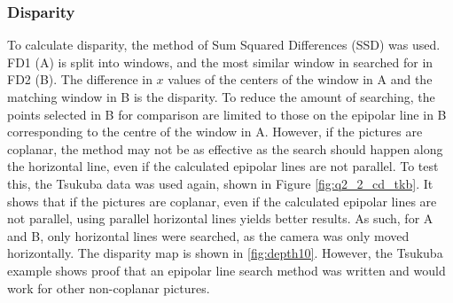\documentclass[a4paper, 10pt, conference]{ieeeconf}
\begin{document}
\subsubsection{Disparity}
To calculate disparity, the method of Sum Squared Differences (SSD) was used. FD1 (A) is split into windows, and the most similar window in searched for in FD2 (B). The difference in $x$ values of the centers of the window in A and the matching window in B is the disparity. To reduce the amount of searching, the points selected in B for comparison are limited to those on the epipolar line in B corresponding to the centre of the window in A. However, if the pictures are coplanar, the method may not be as effective as the search should happen along the horizontal line, even if the calculated epipolar lines are not parallel. To test this, the Tsukuba data was used again, shown in Figure \ref{fig:q2_2_cd_tkb}. It shows that if the pictures are coplanar, even if the calculated epipolar lines are not parallel, using parallel horizontal lines yields better results. As such, for A and B, only horizontal lines were searched, as the camera was only moved horizontally. The disparity map is shown in \ref{fig:depth10}.  However, the Tsukuba example shows proof that an epipolar line search method was written and would work for other non-coplanar pictures.
\end{document}
